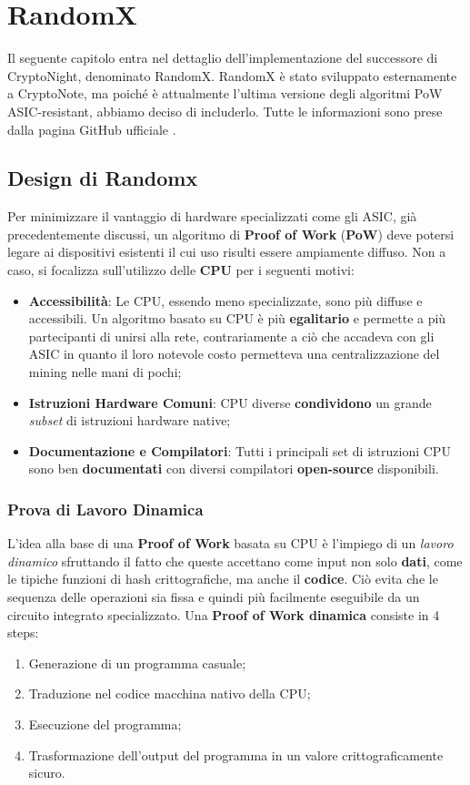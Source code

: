 \chapter{RandomX}

Il seguente capitolo entra nel dettaglio dell'implementazione del successore di CryptoNight, denominato RandomX. RandomX è stato sviluppato esternamente a CryptoNote, ma poiché è attualmente l'ultima versione degli algoritmi PoW ASIC-resistant, abbiamo deciso di includerlo. Tutte le informazioni sono prese dalla pagina GitHub ufficiale \cite{randomx}.

\section{Design di Randomx}
Per minimizzare il vantaggio di hardware specializzati come gli ASIC, già precedentemente discussi, un algoritmo di \textbf{Proof of Work} (\textbf{PoW}) deve potersi legare ai dispositivi esistenti il cui uso risulti essere ampiamente diffuso. Non a caso, si focalizza sull'utilizzo delle \textbf{CPU} per i seguenti motivi:

\begin{itemize}
    \item \textbf{Accessibilità}: Le CPU, essendo meno specializzate, sono più diffuse e accessibili. Un algoritmo basato su CPU è più \textbf{egalitario} e permette a più partecipanti di unirsi alla rete, contrariamente a ciò che accadeva con gli ASIC in quanto il loro notevole costo permetteva una centralizzazione del mining nelle mani di pochi;
    \item \textbf{Istruzioni Hardware Comuni}: CPU diverse \textbf{condividono} un grande \textit{subset} di istruzioni hardware native;
    \item \textbf{Documentazione e Compilatori}: Tutti i principali set di istruzioni CPU sono ben \textbf{documentati} con diversi compilatori \textbf{open-source} disponibili.
\end{itemize}

\subsection{Prova di Lavoro Dinamica} 
L'idea alla base di una \textbf{Proof of Work} basata su CPU è l'impiego di un \textit{lavoro dinamico} sfruttando il fatto che queste accettano come input non solo \textbf{dati}, come le tipiche funzioni di hash crittografiche, ma anche il \textbf{codice}. Ciò evita che le sequenza delle operazioni sia fissa e quindi più facilmente eseguibile da un circuito integrato specializzato. Una \textbf{Proof of Work dinamica} consiste in 4 steps:
\begin{enumerate}
    \item Generazione di un programma casuale;
    \item Traduzione nel codice macchina nativo della CPU;
    \item Esecuzione del programma;
    \item Trasformazione dell'output del programma in un valore crittograficamente sicuro.
\end{enumerate}

